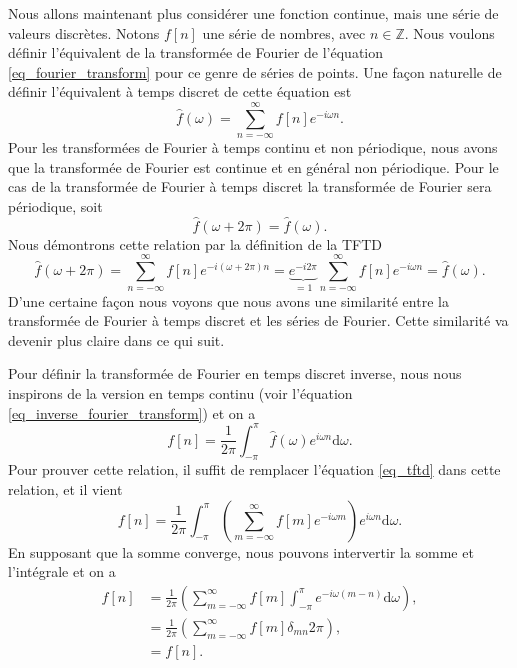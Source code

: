 \documentclass[a4paper,12pt]{book}
\newcommand{\integer}{\mathbb{Z}}
\newcommand{\dd}{\mathrm{d}}
\newcommand{\fh}{\hat{f}}
\renewcommand{\eqref}[1]{\ref{#1}}
\begin{document}
Nous allons maintenant plus considérer une fonction continue, mais une série de valeurs discrètes.
Notons $f[n]$ une série de nombres, avec $n\in\integer$. Nous voulons définir l'équivalent de la transformée 
de Fourier de l'équation \eqref{eq_fourier_transform} pour ce genre de séries de points. Une façon naturelle 
de définir l'équivalent à temps discret de cette équation est 
\begin{equation}
 \fh(\omega)=\sum_{n=-\infty}^\infty f[n] e^{-i\omega n}.\label{eq_tftd}
\end{equation}
Pour les transformées de Fourier à temps continu et non périodique, nous avons que la transformée de Fourier
est continue et en général non périodique. Pour le cas de la transformée de Fourier à temps discret
la transformée de Fourier sera périodique, soit
\begin{equation}
 \fh(\omega+2\pi)=\fh(\omega).
\end{equation}
Nous démontrons cette relation par la définition de la TFTD
\begin{equation}
 \fh(\omega+2\pi)=\sum_{n=-\infty}^\infty f[n] e^{-i(\omega+2\pi) n}=\underbrace{e^{-i2\pi}}_{=1}\sum_{n=-\infty}^\infty f[n] e^{-i\omega n}=\fh(\omega).
\end{equation}
D'une certaine façon nous voyons que nous avons une similarité entre la transformée de Fourier à temps discret et les séries de Fourier.
Cette similarité va devenir plus claire dans ce qui suit.

Pour définir la transformée de Fourier en temps discret inverse, nous nous inspirons de la version
en temps continu (voir l'équation \eqref{eq_inverse_fourier_transform}) et on a 
\begin{equation}
 f[n]=\frac{1}{2\pi}\int_{-\pi}^\pi\fh(\omega)e^{i\omega n}\dd \omega. \label{eq_tftdi}
\end{equation}
Pour prouver cette relation, il suffit de remplacer l'équation \eqref{eq_tftd} dans cette relation,
et il vient
\begin{equation}
 f[n]=\frac{1}{2\pi}\int_{-\pi}^\pi \left(\sum_{m=-\infty}^\infty f[m] e^{-i\omega m}\right) e^{i\omega n}\dd \omega.
\end{equation}
En supposant que la somme converge, nous pouvons intervertir la somme et l'intégrale et on a
\begin{align}
 f[n]&=\frac{1}{2\pi}\left(\sum_{m=-\infty}^\infty f[m] \int_{-\pi}^\pi e^{-i\omega (m-n)} \dd \omega\right),\nonumber\\
     &=\frac{1}{2\pi}\left(\sum_{m=-\infty}^\infty f[m] \delta_{mn} 2\pi\right),\nonumber\\
     &=f[n].\nonumber
\end{align}
\end{document}
